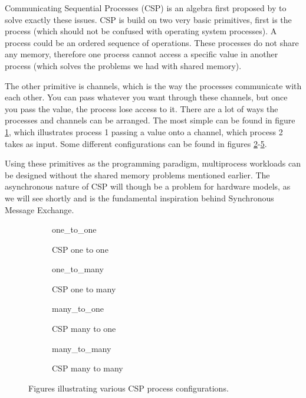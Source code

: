     Communicating Sequential Processes (CSP) is an algebra first proposed by \citet{HoareC1978Csp} to solve exactly these issues.
    CSP is build on two very basic primitives, first is the process (which should not be confused with operating system processes). A process could be an ordered sequence of operations. These processes do not share any memory, therefore one process cannot access a specific value in another process (which solves the problems we had with shared memory).
    
    The other primitive is channels, which is the way the processes communicate with each other. You can pass whatever you want through these channels, but once you pass the value, the process lose access to it. There are a lot of ways the processes and channels can be arranged. The most simple can be found in figure \ref{fig:one_to_one}, which illustrates process 1 passing a value onto a channel, which process 2 takes as input. Some different configurations can be found in figures  \ref{fig:one_to_many}-\ref{fig:many_to_many}. 
    
    Using these primitives as the programming paradigm, multiprocess workloads can be designed without the shared memory problems mentioned earlier. The asynchronous nature of CSP will though be a problem for hardware models, as we will see shortly and is the fundamental inspiration behind Synchronous Message Exchange. 

    \begin{figure}[h!]
        \hspace*{-1.25cm}
        \begin{subfigure}[t]{0.5\textwidth}
            \centering
            {one_to_one}
            \caption{CSP one to one}
            \label{fig:one_to_one}
        \end{subfigure}%
        \hspace*{1cm}
        \begin{subfigure}[t]{0.5\textwidth}
            \centering
            {one_to_many}
            \caption{CSP one to many}
            \label{fig:one_to_many}
        \end{subfigure}
        \vspace*{2cm}
        
        \hspace*{-1cm}
        \begin{subfigure}[b]{0.5\textwidth}
            \centering
            {many_to_one}
            \caption{CSP many to one}
            \label{fig:many_to_one}
        \end{subfigure}%
        \hspace*{1cm}
        \begin{subfigure}[b]{0.5\textwidth}
            \centering
            {many_to_many}
            \caption{CSP many to many}
            \label{fig:many_to_many}
        \end{subfigure}%
        \caption{Figures illustrating various CSP process configurations.}
    \end{figure}
    
